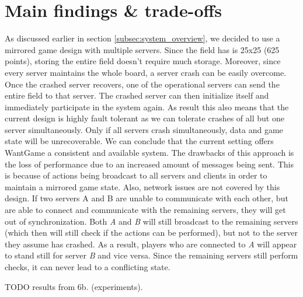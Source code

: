 \section{Main findings \& trade-offs}


	As discussed earlier in section \ref{subsec:system_overview}, we decided to use a mirrored game design with multiple servers. 
	Since the field has is 25x25 (625 points), storing the entire field doesn't require much storage. 
	Moreover, since every server maintains the whole board, a server crash can be easily overcome.
	Once the crashed server recovers, one of the operational servers can send the entire field to that server. 
	The crashed server can then initialize itself and immediately participate in the system again. 
	As result this also means that the current design is highly fault tolerant as we can tolerate crashes of all but one server simultaneously. 
	Only if all servers crash simultaneously, data and game state will be unrecoverable.
	We can conclude that the current setting offers WantGame a consistent and available system. 
	The drawbacks of this approach is the loss of performance due to an increased amount of messages being sent. 
	This is because of actions being broadcast to all servers and clients in order to maintain a mirrored game state. 
	Also, network issues are not covered by this design. 
	If two servers A and B are unable to communicate with each other, but are able to connect and communicate with the remaining servers, they will get out of synchronization. 
	Both \emph{A} and \emph{B} will still broadcast to the remaining servers (which then will still check if the actions can be performed), but not to the server they assume has crashed. 
	As a result, players who are connected to \emph{A} will appear to stand still for server \emph{B} and vice versa. 
	Since the remaining servers still perform checks, it can never lead to a conflicting state.
	
	TODO results from 6b. (experiments).